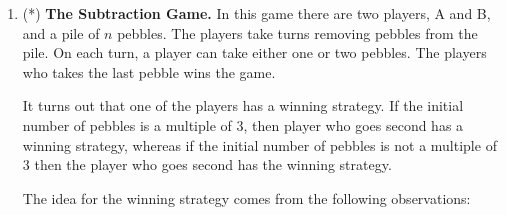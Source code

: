 \documentclass[]{book}
\makeatletter
\newenvironment{Shaded}{\begin{snugshade}}{\end{snugshade}}
\newcommand{\KeywordTok}[1]{\textcolor[rgb]{0.13,0.29,0.53}{\textbf{#1}}}
\newcommand{\DataTypeTok}[1]{\textcolor[rgb]{0.13,0.29,0.53}{#1}}
\newcommand{\DecValTok}[1]{\textcolor[rgb]{0.00,0.00,0.81}{#1}}
\newcommand{\OperatorTok}[1]{\textcolor[rgb]{0.81,0.36,0.00}{\textbf{#1}}}
\newcommand{\NormalTok}[1]{#1}
\newenvironment{kframe}{%
\medskip{}
\setlength{\fboxsep}{.8em}
 \def\at@end@of@kframe{}%
 \ifinner\ifhmode%
  \def\at@end@of@kframe{\end{minipage}}%
  \begin{minipage}{\columnwidth}%
 \fi\fi%
 \def\FrameCommand##1{\hskip\@totalleftmargin \hskip-\fboxsep
 \colorbox{shadecolor}{##1}\hskip-\fboxsep
     \hskip-\linewidth \hskip-\@totalleftmargin \hskip\columnwidth}%
 \MakeFramed {\advance\hsize-\width
   \@totalleftmargin\z@ \linewidth\hsize
   \@setminipage}}%
 {\par\unskip\endMakeFramed%
 \at@end@of@kframe}
\renewenvironment{Shaded}{\begin{kframe}}{\end{kframe}}
\theoremstyle{definition}
\theoremstyle{definition}
\theoremstyle{definition}
\theoremstyle{remark}
\makeatother
\begin{document}
{\begin{enumerate}
\begin{Shaded}
\begin{Highlighting}[]
\KeywordTok{madhavaGraph}\NormalTok{(}\DataTypeTok{n =} \OperatorTok{-}\DecValTok{3}\NormalTok{)}
\end{Highlighting}
\end{Shaded}

\begin{verbatim}
## You need to enter a positive integer.  Try again!
\end{verbatim}

  Here is another example:

\begin{Shaded}
\begin{Highlighting}[]
\KeywordTok{madhavaGraph}\NormalTok{(}\DataTypeTok{n =} \DecValTok{20}\NormalTok{)}
\end{Highlighting}
\end{Shaded}

  The output should be as in Figure \ref{fig:madhavaGraph}.

  \begin{figure}

  {\centering \texttt{[image: r-notes\_files/figure-latex/madhavaGraph-1]} 

  }

  \caption{This is how the output of the     madhavaGraph function should look.}\label{fig:madhavaGraph}
  \end{figure}
\item
  (*) \textbf{The Subtraction Game.} In this game there are two players,
  A and B, and a pile of \(n\) pebbles. The players take turns removing
  pebbles from the pile. On each turn, a player can take either one or
  two pebbles. The players who takes the last pebble wins the game.

  It turns out that one of the players has a winning strategy. If the
  initial number of pebbles is a multiple of 3, then player who goes
  second has a winning strategy, whereas if the initial number of
  pebbles is not a multiple of 3 then the player who goes second has the
  winning strategy.

  The idea for the winning strategy comes from the following
  observations:


\end{enumerate}}
\end{document}
